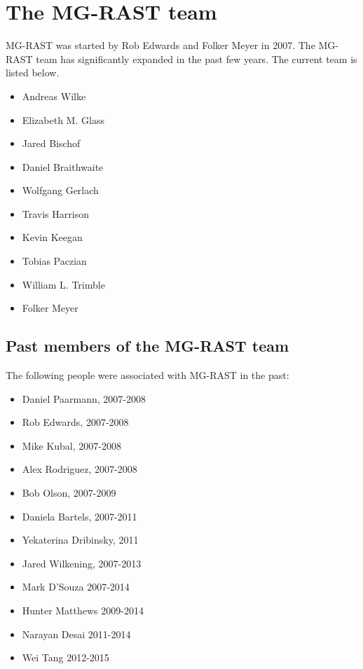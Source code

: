 \documentclass[12pt,fullpage]{report}
\begin{document}
\section{The MG-RAST team}
MG-RAST was started by Rob Edwards and Folker Meyer in 2007.
The MG-RAST team has significantly expanded in the past few years.
The current team is listed below.
\begin{itemize}
\item Andreas Wilke
\item Elizabeth M. Glass
\item Jared Bischof
\item Daniel Braithwaite
\item Wolfgang Gerlach
\item Travis Harrison
\item Kevin Keegan
\item Tobias Paczian
\item William L. Trimble
\item Folker Meyer
\end{itemize}
\subsection*{Past members of the MG-RAST team}
The following people were associated with MG-RAST in the past:

\begin{itemize}
\item    Daniel Paarmann, 2007-2008
\item    Rob Edwards, 2007-2008
\item    Mike Kubal, 2007-2008
\item    Alex Rodriguez, 2007-2008
\item    Bob Olson, 2007-2009
\item    Daniela Bartels, 2007-2011
\item    Yekaterina Dribinsky, 2011
\item    Jared Wilkening, 2007-2013
\item    Mark D'Souza 2007-2014
\item    Hunter Matthews 2009-2014
\item    Narayan Desai 2011-2014
\item    Wei Tang  2012-2015
\end{itemize}
\end{document}
